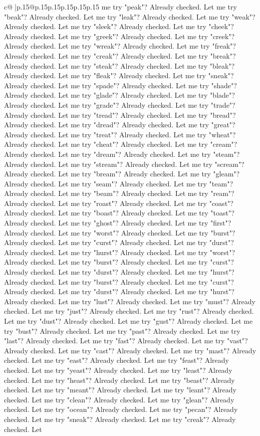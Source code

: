 \documentclass{article}
\begin{document}
{\begin{supertabular}{c@{$\;$}|p{.15\linewidth}@{}p{.15\linewidth}p{.15\linewidth}p{.15\linewidth}p{.15\linewidth}p{.15\linewidth}}
{{{me try "peak"? Already checked. Let me try "beak"? Already checked. Let me try "leak"? Already checked. Let me try "weak"? Already checked. Let me try "sleek"? Already checked. Let me try "cheek"? Already checked. Let me try "greek"? Already checked. Let me try "creek"? Already checked. Let me try "wreak"? Already checked. Let me try "freak"? Already checked. Let me try "creak"? Already checked. Let me try "break"? Already checked. Let me try "steak"? Already checked. Let me try "bleak"? Already checked. Let me try "fleak"? Already checked. Let me try "sneak"? Already checked. Let me try "spade"? Already checked. Let me try "shade"? Already checked. Let me try "glade"? Already checked. Let me try "blade"? Already checked. Let me try "grade"? Already checked. Let me try "trade"? Already checked. Let me try "tread"? Already checked. Let me try "bread"? Already checked. Let me try "dread"? Already checked. Let me try "great"? Already checked. Let me try "treat"? Already checked. Let me try "wheat"? Already checked. Let me try "cheat"? Already checked. Let me try "cream"? Already checked. Let me try "dream"? Already checked. Let me try "steam"? Already checked. Let me try "stream"? Already checked. Let me try "scream"? Already checked. Let me try "bream"? Already checked. Let me try "gleam"? Already checked. Let me try "seam"? Already checked. Let me try "team"? Already checked. Let me try "beam"? Already checked. Let me try "ream"? Already checked. Let me try "roast"? Already checked. Let me try "coast"? Already checked. Let me try "boast"? Already checked. Let me try "toast"? Already checked. Let me try "ghost"? Already checked. Let me try "first"? Already checked. Let me try "worst"? Already checked. Let me try "burst"? Already checked. Let me try "curst"? Already checked. Let me try "durst"? Already checked. Let me try "hurst"? Already checked. Let me try "worst"? Already checked. Let me try "burst"? Already checked. Let me try "curst"? Already checked. Let me try "durst"? Already checked. Let me try "hurst"? Already checked. Let me try "burst"? Already checked. Let me try "curst"? Already checked. Let me try "durst"? Already checked. Let me try "hurst"? Already checked. Let me try "lust"? Already checked. Let me try "must"? Already checked. Let me try "just"? Already checked. Let me try "rust"? Already checked. Let me try "dust"? Already checked. Let me try "gust"? Already checked. Let me try "bust"? Already checked. Let me try "past"? Already checked. Let me try "last"? Already checked. Let me try "fast"? Already checked. Let me try "vast"? Already checked. Let me try "cast"? Already checked. Let me try "mast"? Already checked. Let me try "east"? Already checked. Let me try "feast"? Already checked. Let me try "yeast"? Already checked. Let me try "least"? Already checked. Let me try "heast"? Already checked. Let me try "beast"? Already checked. Let me try "meant"? Already checked. Let me try "leant"? Already checked. Let me try "clean"? Already checked. Let me try "glean"? Already checked. Let me try "ocean"? Already checked. Let me try "pecan"? Already checked. Let me try "sneak"? Already checked. Let me try "creak"? Already checked. Let }}}
\end{supertabular}}
\end{document}
